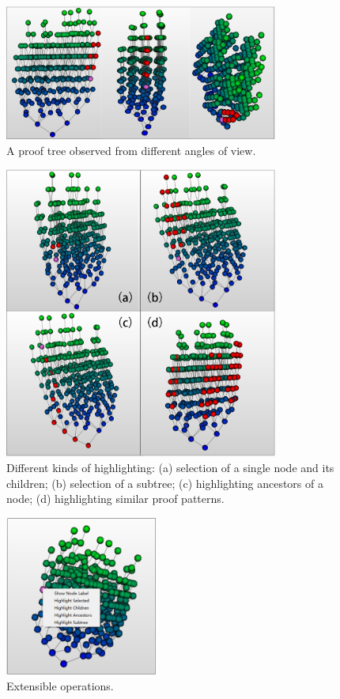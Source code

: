 \documentclass[runningheads]{llncs}
\begin{document}
\begin{figure}[h]
\centering
\includegraphics[width=9cm]{./phi_prooftreegraph_angles.png}
\caption{A proof tree observed from different angles of view.}
\label{fig:prooftree_angles}
\end{figure}
 
 
\begin{figure}[h!]
\centering
\includegraphics[width=9cm]{./high_different.png}
\caption{Different kinds of highlighting: (a) selection of a single node and its children; (b) selection of a subtree; (c) highlighting ancestors of a node; (d) highlighting similar proof patterns.}
\label{fig:high_different}
\end{figure}
\begin{figure}[h!]
\centering
\includegraphics[width=5cm]{./user_defined_operation.png}
\caption{Extensible operations.}
\label{fig:user_defined_operation}
\end{figure}
\smallskip
\end{document}
